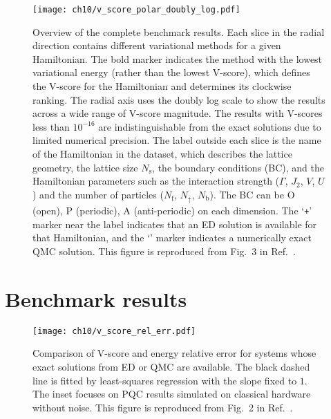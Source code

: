 \begin{figure}[!h]
\centering
\hspace*{-0.05\linewidth}
\texttt{[image: ch10/v\_score\_polar\_doubly\_log.pdf]}
\caption[Overview of VarBench results]{
Overview of the complete benchmark results.
Each slice in the radial direction contains different variational methods for a given Hamiltonian. The bold marker indicates the method with the lowest variational energy (rather than the lowest V-score), which defines the V-score for the Hamiltonian and determines its clockwise ranking.
The radial axis uses the doubly log scale to show the results across a wide range of V-score magnitude.
The results with V-scores less than $10^{-16}$ are indistinguishable from the exact solutions due to limited numerical precision.
The label outside each slice is the name of the Hamiltonian in the dataset, which describes the lattice geometry, the lattice size $N_\text{s}$, the boundary conditions (BC), and the Hamiltonian parameters such as the interaction strength ($\Gamma$, $J_2$, $V$, $U$) and the number of particles ($N_\mathrm{f}$, $N_{\uparrow}$, $N_\mathrm{b}$).
The BC can be O (open), P (periodic), A (anti-periodic) on each dimension.
The `\texttt{+}' marker near the label indicates that an ED solution is available for that Hamiltonian, and the `\texttt{\textasteriskcentered}' marker indicates a numerically exact QMC solution.
This figure is reproduced from Fig.~3 in Ref.~\cite{wu2024variational}.
}
\label{fig:v-score}
\end{figure}

\newpage

\section{Benchmark results}

\begin{figure}[htb]
\centering
\texttt{[image: ch10/v\_score\_rel\_err.pdf]}
\caption[Comparison of V-score and energy relative error]{
Comparison of V-score and energy relative error for systems whose exact solutions from ED or QMC are available.
The black dashed line is fitted by least-squares regression with the slope fixed to $1$.
The inset focuses on PQC results simulated on classical hardware without noise.
This figure is reproduced from Fig.~2 in Ref.~\cite{wu2024variational}.
}
\label{fig:v-score-rel-err}
\end{figure}

